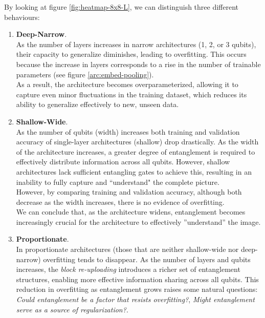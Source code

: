 
By looking at figure \ref{fig:heatmap-8x8-L}, we can distinguish 
three different behaviours:

\begin{enumerate}
    \item \textbf{Deep-Narrow}.\\
    As the number of layers increases in narrow architectures (1, 2, or 3 qubits), their capacity to 
    generalize diminishes, leading to overfitting. This occurs because the increase in layers corresponds 
    to a rise in the number of trainable parameters (see figure \ref{arc:embed-pooling}).\\
    As a result, the architecture becomes overparameterized, allowing it to capture even minor 
    fluctuations in the training dataset, which reduces its ability to generalize effectively to new, 
    unseen data.
    \item \textbf{Shallow-Wide}.\\
    As the number of qubits (width) increases both training and validation accuracy of 
    single-layer architectures (shallow) drop drastically.
    As the width of the architecture increases, a greater degree of entanglement is required to 
    effectively distribute information across all qubits. However, shallow architectures lack 
    sufficient entangling gates to achieve this, resulting in an inability to fully capture and 
    “understand" the complete picture.\\
    However, by comparing training and validation accuracy, although both decrease as 
    the width increases, there is no evidence of overfitting.\\
    We can conclude that, as the architecture widens, entanglement becomes increasingly crucial for the 
    architecture to effectively ”understand” the image.
    \item \textbf{Proportionate}.\\
    In proportionate architectures (those that are neither shallow-wide nor deep-narrow) overfitting 
    tends to disappear. As the number of layers and qubits increases, the \textit{block re-uploading} 
    introduces a richer set of entanglement structures, enabling more effective information sharing 
    across all qubits. This reduction in overfitting as entanglement grows raises some natural questions:
    \textit{Could entanglement be a factor that resists overfitting?}, 
    \textit{Might entanglement serve as a source of regularization?}.
\end{enumerate}


